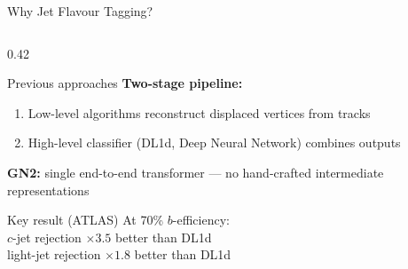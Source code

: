 \documentclass[aspectratio=169, 10pt]{beamer}
\begin{document}
\begin{frame}{Why Jet Flavour Tagging?}
\begin{columns}[T]
\begin{column}{0.42\textwidth}
    \begin{block}{Previous approaches}
      \textbf{Two-stage pipeline:}
      \begin{enumerate}
        \item Low-level algorithms reconstruct displaced vertices from tracks
        \item High-level classifier (DL1d, Deep Neural Network) combines outputs
      \end{enumerate}
      \vspace{4pt}
      \textbf{GN2:} single end-to-end transformer --- no hand-crafted intermediate
      representations
    \end{block}
    \vspace{4pt}
    \begin{alertblock}{Key result (ATLAS)}
      At 70\% $b$-efficiency:\\
      $c$-jet rejection $\times 3.5$ better than DL1d\\
      light-jet rejection $\times 1.8$ better than DL1d
    \end{alertblock}
  \end{column}
\end{columns}
\end{frame}
\end{document}
